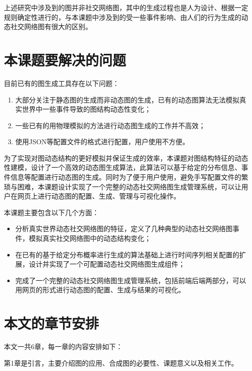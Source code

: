 上述研究中涉及到的图并非社交网络图，其中的生成过程也是人为设计、根据一定规则确定性进行的，与本课题中涉及到的受一些事件影响、由人们的行为生成的动态社交网络图有很大的区别。

\section{本课题要解决的问题}
\label{content:problem}

目前已有的图生成工具存在以下问题：

\begin{enumerate}
  \item 大部分关注于静态图的生成而非动态图的生成，已有的动态图算法无法模拟真实世界中一些事件导致的图结构动态性变化；
  \item 一些已有的用物理模拟的方法\cite{De2014Dynamic}进行动态图生成的工作并不高效；
  \item 使用JSON等配置文件的格式进行配置\cite{FastSGG}，用户使用不方便。
\end{enumerate}

\vspace{0.2cm}

为了实现对图动态结构的更好模拟并保证生成的效率，本课题对图结构特征的动态性建模，设计了一个高效的动态图生成算法，此算法可以基于给定的分布信息、事件信息等配置进行动态图的生成。同时为了便于用户使用，避免手写配置文件的繁琐与困难，本课题设计实现了一个完整的动态社交网络图生成管理系统，可以让用户在网页上进行动态图的配置、生成、管理与可视化操作。

本课题主要包含以下几个方面：

\begin{itemize}
  \item 分析真实世界动态社交网络图的特征，定义了几种典型的动态社交网络图事件，模拟真实社交网络图中的动态结构变化；
  \item 在已有的基于给定分布概率进行生成的算法\cite{FastSGG}基础上进行时间序列相关配置的扩展，设计并实现了一个可配置动态社交网络图生成组件；
  \item 完成了一个完整的动态社交网络图生成管理系统，包括前端后端两部分，可以用网页的形式进行动态图的配置、生成与结果的可视化。
\end{itemize}

\section{本文的章节安排}

本文一共6章，每一章的内容安排如下：

第1章是引言，主要介绍图的应用、合成图的必要性、课题意义以及相关工作。

